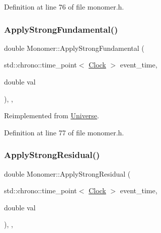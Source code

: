 Definition at line 76 of file monomer.\+h.

\mbox{\label{class_monomer_aa186454670f7796e196509238d419a35}} 
\subsubsection{\texorpdfstring{Apply\+Strong\+Fundamental()}{ApplyStrongFundamental()}}
{\footnotesize\ttfamily double Monomer\+::\+Apply\+Strong\+Fundamental (\begin{DoxyParamCaption}\item[{std\+::chrono\+::time\+\_\+point$<$ \hyperlink{universe_8h_a0ef8d951d1ca5ab3cfaf7ab4c7a6fd80}{Clock} $>$}]{event\+\_\+time,  }\item[{double}]{val }\end{DoxyParamCaption})\hspace{0.3cm}{\ttfamily [inline]}, {\ttfamily [final]}, {\ttfamily [virtual]}}



Reimplemented from \hyperlink{class_universe_a62789bcff84bd750b0366004381e2fdd}{Universe}.



Definition at line 77 of file monomer.\+h.

\mbox{\label{class_monomer_a921f7add2d446b8670513220ace6c4b2}} 
\subsubsection{\texorpdfstring{Apply\+Strong\+Residual()}{ApplyStrongResidual()}}
{\footnotesize\ttfamily double Monomer\+::\+Apply\+Strong\+Residual (\begin{DoxyParamCaption}\item[{std\+::chrono\+::time\+\_\+point$<$ \hyperlink{universe_8h_a0ef8d951d1ca5ab3cfaf7ab4c7a6fd80}{Clock} $>$}]{event\+\_\+time,  }\item[{double}]{val }\end{DoxyParamCaption})\hspace{0.3cm}{\ttfamily [inline]}, {\ttfamily [final]}, {\ttfamily [virtual]}}



